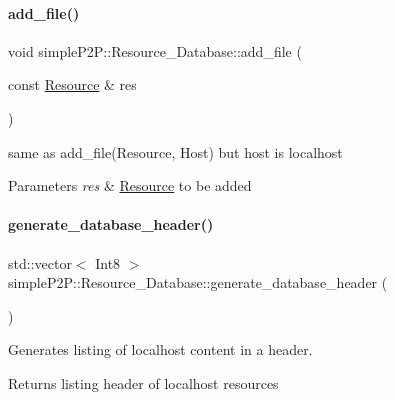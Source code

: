 \paragraph{\texorpdfstring{add\+\_\+file()}{add\_file()}\hspace{0.1cm}{\footnotesize\ttfamily [2/2]}}
{\footnotesize\ttfamily void simple\+P2\+P\+::\+Resource\+\_\+\+Database\+::add\+\_\+file (\begin{DoxyParamCaption}\item[{const \hyperlink{classsimpleP2P_1_1Resource}{Resource} \&}]{res }\end{DoxyParamCaption})\hspace{0.3cm}{\ttfamily [inline]}}



same as add\+\_\+file(\+Resource, Host) but host is localhost 


\begin{DoxyParams}{Parameters}
{\em res} & \hyperlink{classsimpleP2P_1_1Resource}{Resource} to be added \\
\hline
\end{DoxyParams}
\mbox{\label{classsimpleP2P_1_1Resource__Database_a3c226a6c72d0796cc9b86bda01502cbf}} 
\paragraph{\texorpdfstring{generate\+\_\+database\+\_\+header()}{generate\_database\_header()}}
{\footnotesize\ttfamily std\+::vector$<$ Int8 $>$ simple\+P2\+P\+::\+Resource\+\_\+\+Database\+::generate\+\_\+database\+\_\+header (\begin{DoxyParamCaption}{ }\end{DoxyParamCaption})}



Generates listing of localhost content in a header. 

\begin{DoxyReturn}{Returns}
listing header of localhost resources 
\end{DoxyReturn}
\mbox{\label{classsimpleP2P_1_1Resource__Database_abcb6489372a4030199425ce45aaa5a6b}} 
